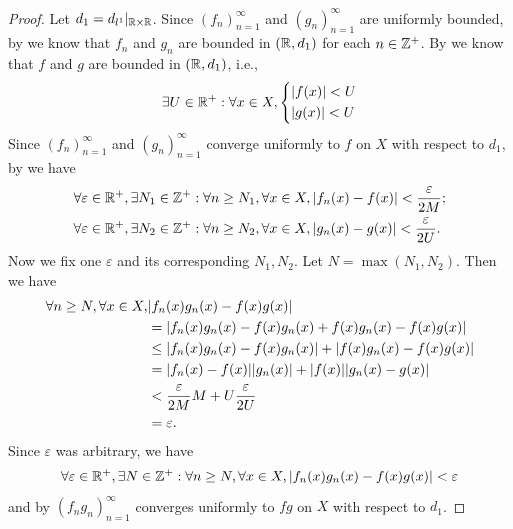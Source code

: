 \begin{proof}
  Let \(d_1 = d_{l^1}|_{\mathbb{R} \times \mathbb{R}}\).
  Since \((f_n)_{n = 1}^\infty\) and \((g_n)_{n = 1}^\infty\) are uniformly bounded, by  we know that \(f_n\) and \(g_n\) are bounded in \((\mathbb{R}, d_1)\) for each \(n \in \mathbb{Z}^+\).
  By  we know that \(f\) and \(g\) are bounded in \((\mathbb{R}, d_1)\), i.e.,
  \[
    \exists U \in \mathbb{R}^+ : \forall x \in X, \begin{dcases}
      \left\lvert f(x)\right\rvert < U \\
      \left\lvert g(x)\right\rvert < U
    \end{dcases}
  \]
  Since \((f_n)_{n = 1}^\infty\) and \((g_n)_{n = 1}^\infty\) converge uniformly to \(f\) on \(X\) with respect to \(d_1\), by  we have
  \begin{align*}
     & \forall \varepsilon \in \mathbb{R}^+, \exists N_1 \in \mathbb{Z}^+ : \forall n \geq N_1, \forall x \in X, \left\lvert f_n(x) - f(x)\right\rvert < \dfrac{\varepsilon}{2M}; \\
     & \forall \varepsilon \in \mathbb{R}^+, \exists N_2 \in \mathbb{Z}^+ : \forall n \geq N_2, \forall x \in X, \left\lvert g_n(x) - g(x)\right\rvert < \dfrac{\varepsilon}{2U}.
  \end{align*}
  Now we fix one \(\varepsilon\) and its corresponding \(N_1, N_2\).
  Let \(N = \max(N_1, N_2)\).
  Then we have
  \begin{align*}
    \forall n \geq N, \forall x \in X, & \abs{f_n(x) g_n(x) - f(x) g(x)}                                        \\
                                       & = \abs{f_n(x) g_n(x) - f(x) g_n(x) + f(x) g_n(x) - f(x) g(x)}          \\
                                       & \leq \abs{f_n(x) g_n(x) - f(x) g_n(x)} + \abs{f(x) g_n(x) - f(x) g(x)} \\
                                       & = \abs{f_n(x) - f(x)} \abs{g_n(x)} + \abs{f(x)} \abs{g_n(x) - g(x)}    \\
                                       & < \dfrac{\varepsilon}{2M} M + U \dfrac{\varepsilon}{2U}                \\
                                       & = \varepsilon.
  \end{align*}
  Since \(\varepsilon\) was arbitrary, we have
  \[
    \forall \varepsilon \in \mathbb{R}^+, \exists N \in \mathbb{Z}^+ : \forall n \geq N, \forall x \in X, \left\lvert f_n(x) g_n(x) - f(x) g(x)\right\rvert < \varepsilon
  \]
  and by  \((f_n g_n)_{n = 1}^\infty\) converges uniformly to \(fg\) on \(X\) with respect to \(d_1\).
\end{proof}
